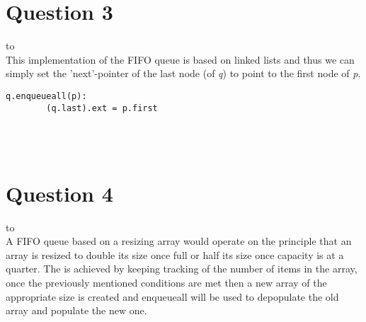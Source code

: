 \documentclass[a4paper]{article}
\def\headline#1{\hbox to \hsize{\hrulefill\quad\lower.3em\hbox{#1}\quad\hrulefill}}
\begin{document}
\section*{Question 3}
\headline{-} \ \\
This implementation of the FIFO queue is based on linked lists and thus we can simply set the 
'next'-pointer of the last node (of \textit{q}) to point to the first node of \textit{p}.
 \\

\noindent

\begin{lstlisting}[escapeinside={{*}{*}}]
    q.enqueueall(p):
        (q.last).ext = p.first
\end{lstlisting}
 
\ \\

\ \\
\section*{Question 4}
\headline{-} \ \\
A FIFO queue based on a resizing array would operate on the principle that an array is resized 
to double its size once full or half its size once capacity is at a quarter. The is achieved by keeping tracking of 
the number of items in the array, once the previously mentioned conditions are met then a new array 
of the appropriate size is created and enqueueall will be used to depopulate the old array and populate the new one.
\\
\end{document}
